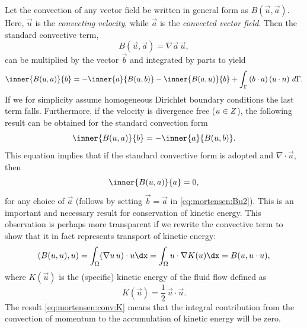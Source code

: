 Let the convection of any vector field be written in general form as
$B(\vec{u},\vec{a})$. Here, $\vec{u}$ is the \emph{convecting
  velocity}, while $\vec{a}$ is the \emph{convected vector field}. Then
  the standard convective term,
\begin{equation}
B(\vec{u},\vec{a}) =  \nabla \vec{a} \, \vec{u},
\end{equation}
can be multiplied by the vector $\vec{b}$ and integrated by parts to yield
\begin{equation}
 \inner{ B(\vec{u}, \vec{a})}{\vec{b}} = -\inner{\vec{a}}{B(\vec{u},\vec{b})} - \inner{B (\vec{a}, \vec{u})}{\vec{b} } + \int_{\Gamma} \left(\vec{b} \cdot \vec{a} \right)\left(\vec{u} \cdot \vec{n} \right) \, d\Gamma.
\label{eq:mortensen:Bu1}
\end{equation}
If we for simplicity assume homogeneous Dirichlet boundary conditions
the last term falls. Furthermore, if the velocity is divergence free
(${u}\in Z$), the following result can be obtained for the
standard convection form
\begin{equation}
  \inner{ B(\vec{u},\vec{a})}{\vec{b} } = -\inner{ \vec{a}}{ B(\vec{u},\vec{b}) }.
\label{eq:mortensen:Bu2}
\end{equation}
This equation implies that if the standard convective form is adopted
and $\nabla\cdot\vec{u}$, then
\begin{equation}
\inner{ B(\vec{u}, \vec{a})}{ \vec{a} } = 0,
\label{eq:mortensen:B0}
\end{equation}
for any choice of $\vec{a}$ (follows by setting $\vec{b}=\vec{a}$ in
\eqref{eq:mortensen:Bu2}). This is an important and necessary result
for conservation of kinetic energy. This observation is perhaps more
transparent if we rewrite the convective term to show that it in fact
represents transport of kinetic energy:
\begin{equation}
\label{eq:mortensen:conv:K}
\left(B(\vec{u}, \vec{u}), \vec{u} \right)
= \int_\Omega (\nabla\vec{u} \, \vec{u})\cdot\vec{u}\dx
= \int_\Omega \vec{u}\cdot\nabla K(\vec{u})\dx
= B(\vec{u}, \vec{u}\cdot\vec{u}),
\end{equation}
where $K(\vec{u})$ is the (specific) kinetic energy of the fluid flow
defined as
\begin{equation}
 K(\vec{u})=\frac{1}{2}\, \vec{u}\cdot \vec{u}. \label{eq:mortensen:K}
\end{equation}
The result \eqref{eq:mortensen:conv:K} means that the integral
contribution from the convection of momentum to the accumulation of
kinetic energy will be zero.

